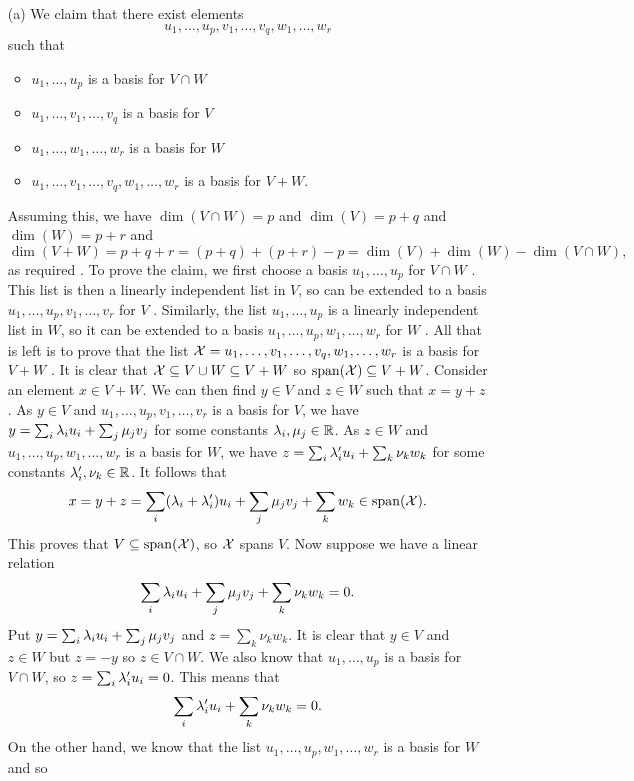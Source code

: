 \documentclass[a4paper]{article}
\begin{document}
\begin{solution}
 \begin{itemize}
  \item[(a)] We claim that there exist elements 
   \[ u_1,\dotsc,u_p,v_1,\dotsc,v_q,w_1,\dotsc,w_r \]
   such that
   \begin{itemize}
   \item $u_1,\dotsc,u_p$ is a basis for $V\cap W$
   \item $u_1,\dotsc,v_1,\dotsc,v_q$ is a basis for $V$
   \item $u_1,\dotsc,w_1,\dotsc,w_r$ is a basis for $W$
   \item $u_1,\dotsc,v_1,\dotsc,v_q,w_1,\dotsc,w_r$ is a basis for $V+W$. 
   \end{itemize}
   Assuming this, we have $\dim(V\cap W)=p$ and
   $\dim(V)=p+q$ and $\dim(W)=p+r$ and 
   \[ \dim(V+W)=p+q+r=(p+q)+(p+r)-p=\dim(V)+\dim(W)-\dim(V\cap W),
   \]
   as required .  To prove the claim, we first choose a basis
   $u_1,\dotsc,u_p$ for $V\cap W$ \mk.  This list is then a
   linearly independent list in $V$, so can be extended to a
   basis $u_1,\dotsc,u_p,v_1,\dotsc,v_r$ for $V$ \mk. 
   Similarly, the list $u_1,\dotsc,u_p$ is a linearly
   independent list in $W$, so it can be extended to a basis
   $u_1,\dotsc,u_p,w_1,\dotsc,w_r$ for $W$ \mk.  All that is
   left is to prove that the list
   $\mathcal{X}=u_1,\dotsc,v_1,\dotsc,v_q,w_1,\dotsc,w_r$ is a basis
   for $V+W$ \mk.  It is clear that $\mathcal{X}\subseteq V\cup W\subseteq V+W$ so
   $\operatorname{span}(\mathcal{X})\subseteq V+W$.  Consider an element $x\in V+W$.  We
   can then find $y\in V$ and $z\in W$ such that $x=y+z$. 
   As $y\in V$ and $u_1,\dotsc,u_p,v_1,\dotsc,v_r$ is a
   basis for $V$, we have $y=\sum_i\lambda_iu_i+\sum_j\mu_jv_j$
   for some constants $\lambda_i,\mu_j\in{\mathbb{R}}$.  As $z\in W$ and
   $u_1,\dotsc,u_p,w_1,\dotsc,w_r$ is a basis for $W$, we
   have $z=\sum_i\lambda'_iu_i+\sum_k\nu_kw_k$ for some
   constants $\lambda'_i,\nu_k\in{\mathbb{R}}$.  It follows that
   \[ x=y+z=
       \sum_i(\lambda_i+\lambda'_i)u_i + \sum_j\mu_jv_j + \sum_kw_k 
        \in\operatorname{span}(\mathcal{X}). 
   \]
   This proves that $V\subseteq\operatorname{span}(\mathcal{X})$, so $\mathcal{X}$ spans $V$. 
   Now suppose we have a linear relation 
   \[ \sum_i\lambda_iu_i + \sum_j\mu_jv_j + \sum_k\nu_kw_k=0. \]
   Put $y=\sum_i\lambda_iu_i + \sum_j\mu_jv_j$ and
   $z=\sum_k\nu_kw_k$.  It is clear that $y\in V$ and
   $z\in W$ but $z=-y$ so $z\in V\cap W$.  We also know that
   $u_1,\dotsc,u_p$ is a basis for $V\cap W$, so
   $z=\sum_i\lambda'_iu_i=0$.  This means that 
   \[ \sum_i\lambda'_iu_i + \sum_k\nu_kw_k=0. \]
   On the other hand, we know that the list
   $u_1,\dotsc,u_p,w_1,\dotsc,w_r$ is a basis for $W$ and so

\end{itemize}
\end{solution}
\end{document}
